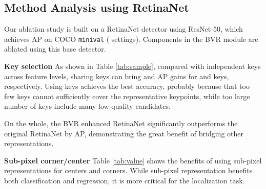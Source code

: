 \documentclass{article}
\begin{document}
\subsection{Method Analysis using RetinaNet}
\label{ablation}

Our ablation study is built on a RetinaNet detector using ResNet-50, which achieves  AP on COCO {\tt minival} ( settings). Components in the BVR module are ablated using this base detector.

{\noindent \textbf{Key selection}} As shown in Table \ref{tab:sample}, compared with independent keys across feature levels, sharing keys can bring  and  AP gains for  and  keys, respectively. Using  keys achieves the best accuracy, probably because that too few keys cannot sufficiently cover the representative keypoints, while too large number of keys include many low-quality candidates. 


On the whole, the BVR enhanced RetinaNet significantly outperforms the original RetinaNet by  AP, demonstrating the great benefit of bridging other representations.

{\noindent \textbf{Sub-pixel corner/center}} Table \ref{tab:value} shows the benefits of using sub-pixel representations for centers and corners. While sub-pixel representation benefits both classification and regression, it is more critical for the localization task.
\end{document}
